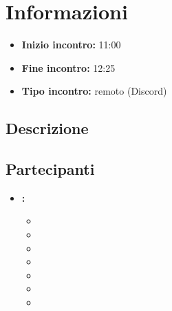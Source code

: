 \section{Informazioni}
\begin{itemize}
	\item \textbf{Inizio incontro:} 11:00
	\item \textbf{Fine incontro:} 12:25
	\item \textbf{Tipo incontro:} remoto (Discord)
\end{itemize}

\subsection{Descrizione}
\DocDescription

\subsection{Partecipanti}

\begin{itemize}
	\item \textbf{\GroupName:}
	\begin{itemize}
		\item \tommaso
		\item \marco
		\item \raul
		\item \sebastiano
		\item \mattia
		\item \martina
		\item \riccardo
	\end{itemize}
\end{itemize}

\clearpage
